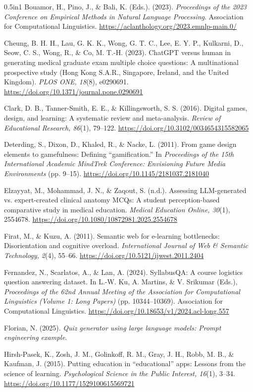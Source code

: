 \documentclass[
  12pt,
  a4paper,
]{report}
\begin{document}
\begin{hangparas}{0.5in}{1}
Bouamor, H., Pino, J., \& Bali, K. (Eds.). (2023). \textit{Proceedings of the 2023 Conference on Empirical Methods in Natural Language Processing}. Association for Computational Linguistics. \url{https://aclanthology.org/2023.emnlp-main.0/}

Cheung, B. H. H., Lau, G. K. K., Wong, G. T. C., Lee, E. Y. P., Kulkarni, D., Seow, C. S., Wong, R., \& Co, M. T.-H. (2023). ChatGPT versus human in generating medical graduate exam multiple choice questions: A multinational prospective study (Hong Kong S.A.R., Singapore, Ireland, and the United Kingdom). \textit{PLOS ONE, 18}(8), e0290691. \url{https://doi.org/10.1371/journal.pone.0290691}

Clark, D. B., Tanner-Smith, E. E., \& Killingsworth, S. S. (2016). Digital games, design, and learning: A systematic review and meta-analysis. \textit{Review of Educational Research, 86}(1), 79--122. \url{https://doi.org/10.3102/0034654315582065}

Deterding, S., Dixon, D., Khaled, R., \& Nacke, L. (2011). From game design elements to gamefulness: Defining ``gamification.'' In \textit{Proceedings of the 15th International Academic MindTrek Conference: Envisioning Future Media Environments} (pp. 9--15). \url{https://doi.org/10.1145/2181037.2181040}

Elzayyat, M., Mohammad, J. N., \& Zaqout, S. (n.d.). Assessing LLM-generated vs. expert-created clinical anatomy MCQs: A student perception-based comparative study in medical education. \textit{Medical Education Online, 30}(1), 2554678. \url{https://doi.org/10.1080/10872981.2025.2554678}

Firat, M., \& Kuzu, A. (2011). Semantic web for e-learning bottlenecks: Disorientation and cognitive overload. \textit{International Journal of Web \& Semantic Technology, 2}(4), 55--66. \url{https://doi.org/10.5121/ijwest.2011.2404}

Fernandez, N., Scarlatos, A., \& Lan, A. (2024). SyllabusQA: A course logistics question answering dataset. In L.-W. Ku, A. Martins, \& V. Srikumar (Eds.), \textit{Proceedings of the 62nd Annual Meeting of the Association for Computational Linguistics (Volume 1: Long Papers)} (pp. 10344--10369). Association for Computational Linguistics. \url{https://doi.org/10.18653/v1/2024.acl-long.557}

Florian, N. (2025). \textit{Quiz generator using large language models: Prompt engineering example}.

Hirsh-Pasek, K., Zosh, J. M., Golinkoff, R. M., Gray, J. H., Robb, M. B., \& Kaufman, J. (2015). Putting education in ``educational'' apps: Lessons from the science of learning. \textit{Psychological Science in the Public Interest, 16}(1), 3--34. \url{https://doi.org/10.1177/1529100615569721}


\end{hangparas}
\end{document}
